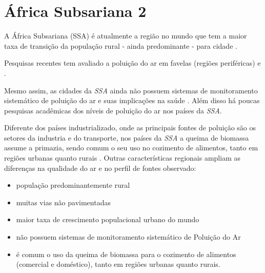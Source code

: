 \section{África Subsariana 2}



A África Subsariana (SSA) é atualmente a região no mundo que tem a maior taxa de transição da população rural - ainda predominante - para cidade 
\citep{MONTGOMERY2008}.

Pesquisas recentes tem avaliado a poluição do ar em favelas 
(regiões periféricas) \citep{SCLAR2005} e \citep{RILEY2007}. 

Mesmo assim, as cidades da \textit{SSA} ainda não possuem sistemas de 
monitoramento sistemático de poluição do ar e suas implicações na saúde 
\citep{EZZATI2004}. 
Além disso há poucas pesquisas acadêmicas dos níveis de poluição do ar nos 
países da \textit{SSA}.

Diferente dos países industrializado, onde as principais fontes de poluição 
são os setores da industria e do transporte, nos países da \textit{SSA} a queima de biomassa assume a primazia, sendo comum o seu uso no cozimento 
de alimentos, tanto em regiões urbanas quanto rurais \citep{SMITH2004}. Outras características regionais ampliam as diferenças na qualidade do ar e no perfil de fontes observado:%
  \begin{itemize}
    \item população predominantemente rural
    \item muitas vias não pavimentadas
    \item maior taxa de crescimento populacional urbano do mundo
    \item não possuem sistemas de monitoramento sistemático de Poluição do Ar
    \item é comum o uso da queima de biomassa para o cozimento de alimentos  
          (comercial e doméstico), tanto em regiões urbanas quanto rurais.
  \end{itemize}

